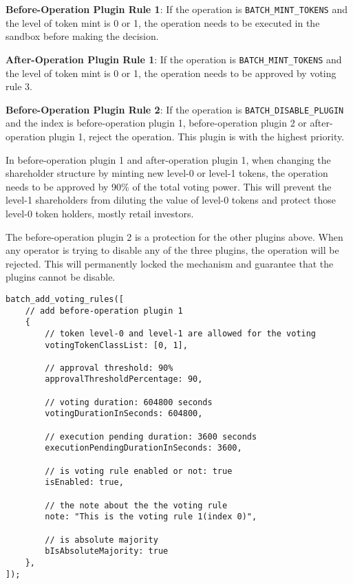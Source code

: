 \documentclass[main.tex]{subfiles}
\begin{document}
\textbf{Before-Operation Plugin Rule 1}: If the operation is \texttt{BATCH\_MINT\_TOKENS} and the level of token mint is 0 or 1, the operation needs to be executed in the sandbox before making the decision.

\textbf{After-Operation Plugin Rule 1}: If the operation is \texttt{BATCH\_MINT\_TOKENS} and the level of token mint is 0 or 1, the operation needs to be approved by voting rule 3.

\textbf{Before-Operation Plugin Rule 2}: If the operation is \texttt{BATCH\_DISABLE\_PLUGIN} and the index is before-operation plugin 1, before-operation plugin 2 or after-operation plugin 1, reject the operation. This plugin is with the highest priority.

In before-operation plugin 1 and after-operation plugin 1, when changing the shareholder structure by minting new level-0 or level-1 tokens, the operation needs to be approved by 90\% of the total voting power. This will prevent the level-1 shareholders from diluting the value of level-0 tokens and protect those level-0 token holders, mostly retail investors.

The before-operation plugin 2 is a protection for the other plugins above. When any operator is trying to disable any of the three plugins, the operation will be rejected. This will permanently locked the mechanism and guarantee that the plugins cannot be disable.

\begin{verbatim}
batch_add_voting_rules([
    // add before-operation plugin 1
    {
        // token level-0 and level-1 are allowed for the voting
        votingTokenClassList: [0, 1], 

        // approval threshold: 90%
        approvalThresholdPercentage: 90,

        // voting duration: 604800 seconds
        votingDurationInSeconds: 604800,

        // execution pending duration: 3600 seconds
        executionPendingDurationInSeconds: 3600,

        // is voting rule enabled or not: true
        isEnabled: true,

        // the note about the the voting rule
        note: "This is the voting rule 1(index 0)",

        // is absolute majority
        bIsAbsoluteMajority: true
    },
]);
\end{verbatim}
\end{document}
